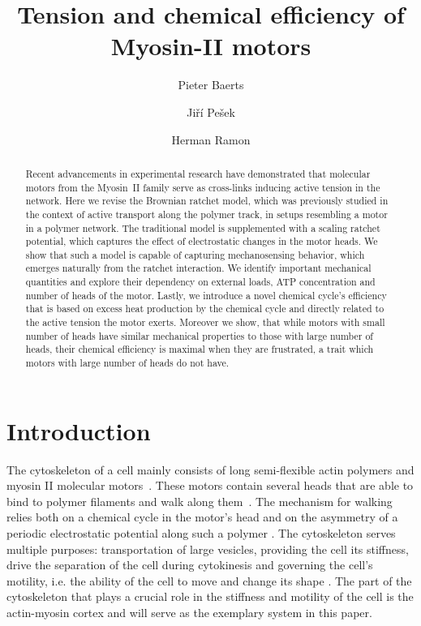 \documentclass[aps,pre,twocolumn,showpacs,showkeys,superscriptaddress,floatfix]{revtex4-1}
\begin{document}
 

\title{Tension and chemical efficiency of Myosin-II motors}
\author{Pieter Baerts}
\author{Jiří Pešek}
\author{Herman Ramon}


\begin{abstract}
Recent advancements in experimental research have demonstrated that molecular motors from the Myosin~II family serve as cross-links inducing active tension in the network. 
Here we revise the Brownian ratchet model, 
which was previously studied in the context of active transport along the polymer track, in setups resembling a motor in a polymer network.
The traditional model is supplemented with a scaling ratchet potential, which captures the effect of electrostatic changes in the motor heads. 
We show that such a model is capable of capturing mechanosensing behavior, which emerges naturally from the ratchet interaction.
We identify important mechanical quantities and explore their dependency on external loads, ATP concentration and number of heads of the motor.
Lastly, we introduce a novel chemical cycle's efficiency that is based on excess heat production by the chemical cycle and directly related to the active tension the motor exerts.
Moreover we show, that while motors with small number of heads have similar mechanical properties to those with large number of heads, 
their chemical efficiency is maximal when they are frustrated, a trait which motors with large number of heads do not have. 
\end{abstract}

\maketitle 

\section{Introduction}
The cytoskeleton of a cell mainly consists of long semi-flexible actin polymers and myosin II molecular motors~\cite{mitchison1996actin}. 
These motors contain several heads that are able to bind to polymer filaments and walk along them~\cite{pollard1982structure}. 
The mechanism for walking relies both on a chemical cycle in the motor's head and on the asymmetry of a periodic electrostatic potential along such a polymer \cite{Reimann2002introduction}. 
The cytoskeleton serves multiple purposes: 
transportation of large vesicles, providing the cell its stiffness, drive the separation of the cell during cytokinesis and governing the cell's motility, i.e. the ability of the cell to move and change its shape \cite{ross2008cargo,mitchison1996actin,rosenblatt2004myosin}.
The part of the cytoskeleton that plays a crucial role in the stiffness and motility of the cell is the actin-myosin cortex \cite{vicente2009non} and will serve as the exemplary system in this paper.
\end{document}
